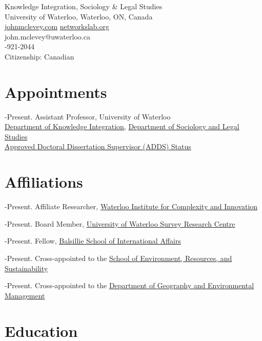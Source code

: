 \noindent Knowledge Integration, Sociology \& Legal Studies\\
\noindent University of Waterloo, Waterloo, ON, Canada\\
\noindent \href{http://www.johnmclevey.com}{johnmclevey.com} \textbar{}
\href{http://networkslab.org}{networkslab.org}\\
\noindent john.mclevey@uwaterloo.ca\\
-921-2044\\
\bigskip
\noindent Citizenship: Canadian

\section{Appointments}\label{appointments}

-Present. Assistant Professor, University of Waterloo\\
\href{https://uwaterloo.ca/knowledge-integration/}{Department of
Knowledge Integration},
\href{https://uwaterloo.ca/sociology-and-legal-studies/}{Department of
Sociology and Legal Studies}\\
\href{https://uwaterloo.ca/graduate-studies/about-graduate-studies/organization-graduate-studies\#6}{Approved
Doctoral Dissertation Supervisor (ADDS) Status}

\section{Affiliations}\label{affiliations}

-Present. Affiliate Researcher,
\href{http://wici.ca/new/}{Waterloo Institute for Complexity and
Innovation}

-Present. Board Member,
\href{http://math.uwaterloo.ca/survey-research-centre/node/1}{University
of Waterloo Survey Research Centre}

-Present. Fellow,
\href{http://www.balsillieschool.ca/}{Balsillie School of International
Affairs}

-Present. Cross-appointed to the
\href{https://uwaterloo.ca/environment-resources-and-sustainability/}{School
of Environment, Resources, and Sustainability}

-Present. Cross-appointed to the
\href{https://uwaterloo.ca/geography-environmental-management/}{Department
of Geography and Environmental Management}

\section{Education}\label{education}

